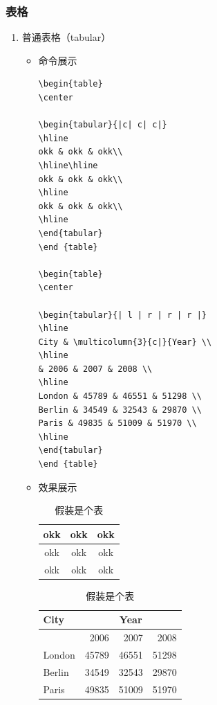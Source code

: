 \documentclass[UTF8]{ctexart}
\begin{document}
\subsubsection{表格}

\begin{enumerate}
  \item 普通表格（tabular）
    \begin{itemize}
      \item 命令展示

\begin{lstlisting}
\begin{table}
\center

\begin{tabular}{|c| c| c|}
\hline
okk & okk & okk\\
\hline\hline
okk & okk & okk\\
\hline
okk & okk & okk\\
\hline
\end{tabular}
\end {table}

\begin{table}
\center

\begin{tabular}{| l | r | r | r |}
\hline
City & \multicolumn{3}{c|}{Year} \\
\hline
& 2006 & 2007 & 2008 \\
\hline
London & 45789 & 46551 & 51298 \\
Berlin & 34549 & 32543 & 29870 \\
Paris & 49835 & 51009 & 51970 \\
\hline
\end{tabular}
\end {table}

\end{lstlisting}
      \item 效果展示


\begin{table}[H]
\center
\caption{假装是个表}
\begin{tabular}{|c| c| c|}
\hline
okk & okk & okk\\
\hline\hline
okk & okk & okk\\
\hline
okk & okk & okk\\
\hline
\end{tabular}
\end {table}


\begin{table}[H]
\center
\caption{假装是个表}
\begin{tabular}{| l | r | r | r |}
\hline
City & \multicolumn{3}{c|}{Year} \\
\hline
& 2006 & 2007 & 2008 \\
\hline
London & 45789 & 46551 & 51298 \\
Berlin & 34549 & 32543 & 29870 \\
Paris & 49835 & 51009 & 51970 \\
\hline
\end{tabular}
\end {table}

 \end{itemize}
\end{enumerate}
\end{document}
